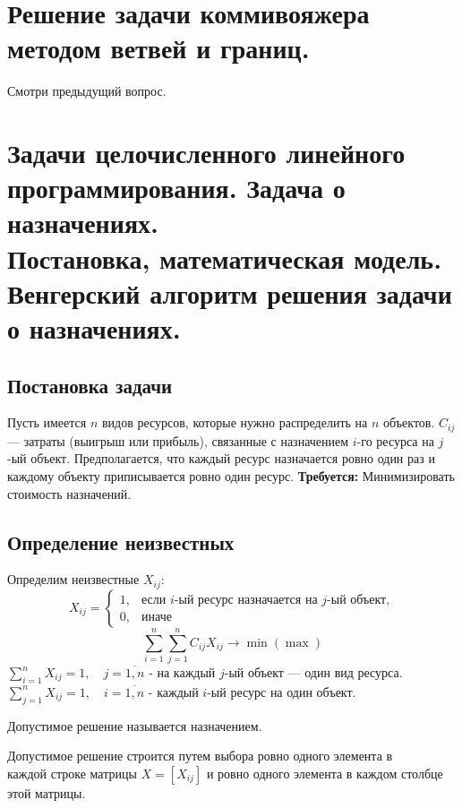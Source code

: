 \documentclass[17pt]{extarticle}
\begin{document}
\section{Решение задачи коммивояжера методом ветвей и границ.}
Смотри предыдущий вопрос.


\section{Задачи целочисленного линейного \\ программирования. Задача о назначениях. \\
  Постановка, математическая модель. \\ Венгерский алгоритм решения задачи о назначениях.}

\subsection{Постановка задачи}
Пусть имеется \( n \) видов ресурсов, которые нужно распределить на \( n \) объектов.
\( C_{ij} \) — затраты (выигрыш или прибыль), связанные с назначением \( i \)-го ресурса на \( j \)-ый объект.
Предполагается, что каждый ресурс назначается ровно один раз и каждому объекту приписывается ровно один ресурс.
\textbf{Требуется:} Минимизировать стоимость назначений.

\subsection{Определение неизвестных}
Определим неизвестные \( X_{ij} \):
\[
    X_{ij} =
    \begin{cases}
        1, & \text{если } i\text{-ый ресурс назначается на } j\text{-ый объект}, \\
        0, & \text{иначе}
    \end{cases}
\]
\[
    \sum_{i=1}^{n} \sum_{j=1}^{n} C_{ij} X_{ij} \rightarrow \min (\max)
\]
$\sum_{i=1}^{n} X_{ij} = 1, \quad j = \overline{1,n}$ - на каждый \( j \)-ый объект — один вид ресурса. \\
$\sum_{j=1}^{n} X_{ij} = 1, \quad i = \overline{1,n}$ - каждый \( i \)-ый ресурс на один объект. \\

\begin{definition}
    Допустимое решение называется назначением.
\end{definition}
Допустимое решение строится путем выбора ровно одного элемента в \\ каждой строке матрицы \( X = [X_{ij}] \) и
ровно одного элемента в каждом столбце этой матрицы.
\end{document}
